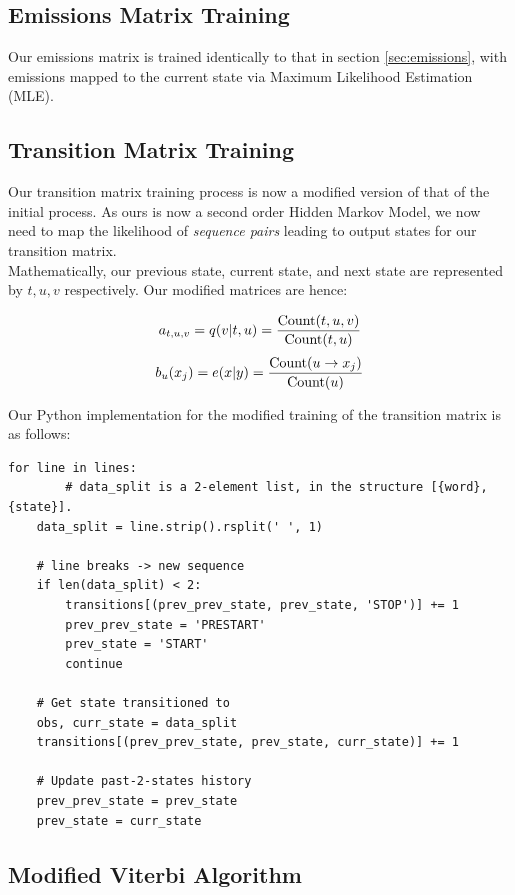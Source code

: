 \documentclass{article}
\numberwithin{equation}{section}
\begin{document}
\subsection{Emissions Matrix Training}
Our emissions matrix is trained identically to that in section \ref{sec:emissions}, with emissions mapped to the current state via Maximum Likelihood Estimation (MLE).

\subsection{Transition Matrix Training}
Our transition matrix training process is now a modified version of that of the initial process. As ours is now a second order Hidden Markov Model, we now need to map the likelihood of \textit{sequence pairs} leading to output states for our transition matrix.\\

Mathematically, our previous state, current state, and next state are represented by $t, u, v$ respectively. Our modified matrices are hence:

$$ a_{t, u, v} = q(v | t, u) = \frac{\text{\lstinline{Count}}(t, u, v)}{\text{\lstinline{Count}}(t, u)} $$
$$ b_u(x_j) = e(x | y) = \frac{\text{\lstinline{Count}}(u \rightarrow x_j)}{\text{\lstinline{Count}}(u)} $$

Our Python implementation for the modified training of the transition matrix is as follows:

\begin{verbatim}
for line in lines:
		# data_split is a 2-element list, in the structure [{word}, {state}].
    data_split = line.strip().rsplit(' ', 1)

    # line breaks -> new sequence
    if len(data_split) < 2:
        transitions[(prev_prev_state, prev_state, 'STOP')] += 1
        prev_prev_state = 'PRESTART'
        prev_state = 'START'
        continue

    # Get state transitioned to
    obs, curr_state = data_split
    transitions[(prev_prev_state, prev_state, curr_state)] += 1

    # Update past-2-states history
    prev_prev_state = prev_state
    prev_state = curr_state
\end{verbatim}

\subsection{Modified Viterbi Algorithm}
\end{document}

